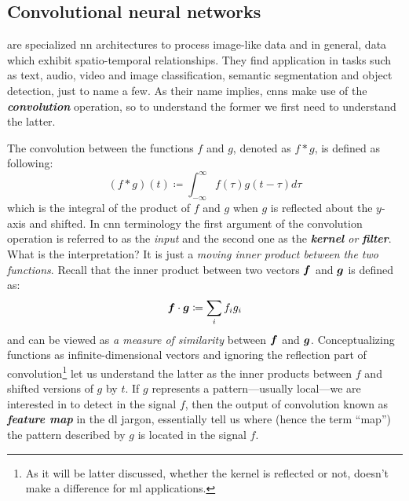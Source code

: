 \subsection{Convolutional neural networks}
\label{subsec:cnn}

 are specialized \gls{nn} architectures to process image-like
data and in general, data which exhibit spatio-temporal
relationships. They find application in
tasks such as text, audio, video and image classification, semantic
segmentation and object detection, just to name a few. As their name implies, \glspl{cnn} make use of
the \emph{\textbf{convolution}} operation, so to understand the former we first
need to understand the latter. 

The convolution between the functions $f$ and $g$, denoted as $f*g$, is defined
as following:
\begin{equation}
	(f*g)(t) \coloneqq \int_{-\infty}^{\infty} f(\tau)g(t - \tau) d\tau
\end{equation}
which is the integral of the product of $f$ and $g$ when $g$ is reflected about
the $y$-axis and shifted. In \gls{cnn} terminology the first argument of the
convolution operation is referred to as the \emph{input} and the second one as
the \emph{\textbf{kernel} or \textbf{filter}}. What
is the interpretation? It is just a \emph{moving inner product between the two
functions}. Recall that the inner product between two
vectors $\boldsymbol{f}$ and $\boldsymbol{g}$ is defined as:
\begin{equation}
	\label{eq:inner_product}
	\boldsymbol{f} \cdot \boldsymbol{g} \coloneqq
	\sum_i f_i g_i
\end{equation}
and can be viewed as \emph{a measure of similarity} between $\boldsymbol{f}$ and
$\boldsymbol{g}$. Conceptualizing functions as infinite-dimensional vectors and ignoring
the reflection part of convolution\footnote{As it will be latter discussed,
whether the kernel is reflected or not, doesn't make a difference for \gls{ml}
applications.} let us understand the latter as the inner products between $f$ and
shifted versions of $g$ by $t$. If $g$ represents a pattern---usually
local---we are interested in to detect in the signal $f$, then the output of
convolution known as \emph{\textbf{feature map}} in
the \gls{dl} jargon, essentially tell us where (hence the term ``map'')
the pattern described by $g$ is located in the signal $f$.

